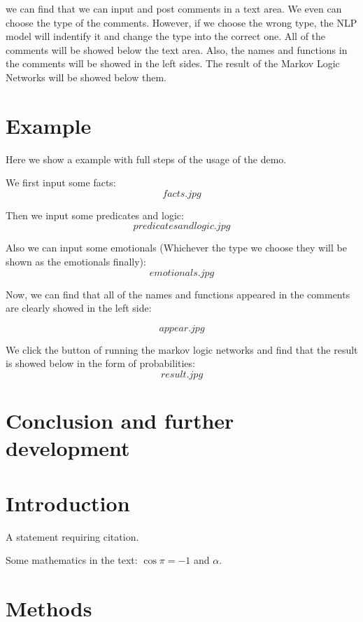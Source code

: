 \documentclass[
12pt, %
a4paper, %
oneside, %
headinclude,footinclude, %
BCOR5mm, %
]{scrartcl}
\begin{document}
we can find that we can input and post comments in a text area. We even can choose the type of the comments. However, if we choose the wrong type, the NLP model will indentify it and change the type into the correct one. All of the comments will be showed below the text area. Also, the names and functions in the comments will be showed in the left sides. The result of the Markov Logic Networks will be showed below them.

\clearpage

\section{Example}
Here we show a example with full steps of the usage of the demo.

We first input some facts:
$$
facts.jpg
$$

Then we input some predicates and logic:
$$
predicates and logic.jpg
$$

Also we can input some emotionals (Whichever the type we choose they will be shown as the emotionals finally):
$$
emotionals.jpg
$$

Now, we can find that all of the names and functions appeared in the comments are clearly showed in the left side:

$$
appear.jpg
$$

We click the button of running the markov logic networks and find that the result is showed below in the form of probabilities:
$$
result.jpg
$$

\section{Conclusion and further development}

\section{Introduction}

A statement requiring citation.

\lipsum[1-3] %

Some mathematics in the text: $\cos\pi=-1$ and $\alpha$.
 

\section{Methods}
\end{document}

